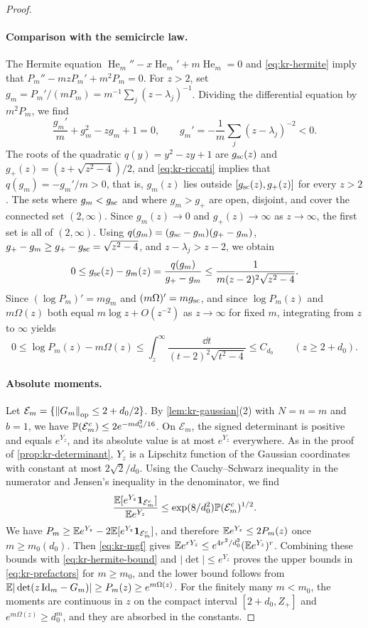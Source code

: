 \begin{proof}
\paragraph{Comparison with the semicircle law.}
The Hermite equation $\operatorname{He}_m''-x\operatorname{He}_m'+m\operatorname{He}_m=0$ and \eqref{eq:kr-hermite} imply that $P_m''-mzP_m'+m^2P_m=0$. For $z>2$, set $g_m=P_m'/(mP_m)=m^{-1}\sum_j(z-\lambda_j)^{-1}$. Dividing the differential equation by $m^2P_m$, we find
\begin{equation}\label{eq:kr-riccati}
\frac{g_m'}m+g_m^2-zg_m+1=0,\qquad g_m'=-\frac1m\sum_j(z-\lambda_j)^{-2}<0.
\end{equation}
The roots of the quadratic $q(y)=y^2-zy+1$ are $g_{\rm sc}(z)$ and $g_+(z)=(z+\sqrt{z^2-4})/2$, and \eqref{eq:kr-riccati} implies that $q(g_m)=-g_m'/m>0$, that is, $g_m(z)$ lies outside $[g_{\rm sc}(z),g_+(z)]$ for every $z>2$. The sets where $g_m<g_{\rm sc}$ and where $g_m>g_+$ are open, disjoint, and cover the connected set $(2,\infty)$. Since $g_m(z)\to0$ and $g_+(z)\to\infty$ as $z\to\infty$, the first set is all of $(2,\infty)$. Using $q(g_m)=(g_{\rm sc}-g_m)(g_+-g_m)$, $g_+-g_m\ge g_+-g_{\rm sc}=\sqrt{z^2-4}$, and $z-\lambda_j>z-2$, we obtain
\[
0\le g_{\rm sc}(z)-g_m(z)=\frac{q(g_m)}{g_+-g_m}\le\frac1{m(z-2)^2\sqrt{z^2-4}}.
\]
Since $(\log P_m)'=mg_m$ and $(m\Omega)'=mg_{\rm sc}$, and since $\log P_m(z)$ and $m\Omega(z)$ both equal $m\log z+O(z^{-2})$ as $z\to\infty$ for fixed $m$, integrating from $z$ to $\infty$ yields
\begin{equation}\label{eq:kr-hermite-bound}
0\le\log P_m(z)-m\Omega(z)\le\int_z^\infty\frac{\dd t}{(t-2)^2\sqrt{t^2-4}}\le C_{d_0}\qquad(z\ge2+d_0).
\end{equation}

\paragraph{Absolute moments.}
Let $\mathcal E_m=\{\left\lVert G_m\right\rVert_{\rm op}\le2+d_0/2\}$. By \cref{lem:kr-gaussian}(2) with $N=n=m$ and $b=1$, we have $\mathbb P(\mathcal E_m^c)\le2e^{-md_0^2/16}$. On $\mathcal E_m$, the signed determinant is positive and equals $e^{Y_z}$, and its absolute value is at most $e^{Y_z}$ everywhere. As in the proof of \cref{prop:kr-determinant}, $Y_z$ is a Lipschitz function of the Gaussian coordinates with constant at most $2\sqrt2/d_0$. Using the Cauchy--Schwarz inequality in the numerator and Jensen's inequality in the denominator, we find
\[
\frac{\mathbb E[e^{Y_z}\mathbf 1_{\mathcal E_m^c}]}{\mathbb E e^{Y_z}}\le\exp(8/d_0^2)\mathbb P(\mathcal E_m^c)^{1/2}.
\]
We have $P_m\ge\mathbb E e^{Y_z}-2\mathbb E[e^{Y_z}\mathbf 1_{\mathcal E_m^c}]$, and therefore $\mathbb E e^{Y_z}\le2P_m(z)$ once $m\ge m_0(d_0)$. Then \eqref{eq:kr-mgf} gives $\mathbb E e^{rY_z}\le e^{4r^2/d_0^2}(\mathbb E e^{Y_z})^r$. Combining these bounds with \eqref{eq:kr-hermite-bound} and $|\det|\le e^{Y_z}$ proves the upper bounds in \eqref{eq:kr-prefactors} for $m\ge m_0$, and the lower bound follows from $\mathbb E|\det(z\,\mathrm{Id}_m-G_m)|\ge P_m(z)\ge e^{m\Omega(z)}$. For the finitely many $m<m_0$, the moments are continuous in $z$ on the compact interval $[2+d_0,Z_+]$ and $e^{m\Omega(z)}\ge d_0^m$, and they are absorbed in the constants.
\end{proof}

